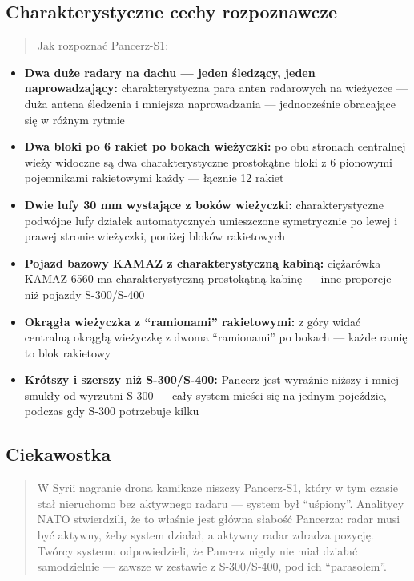 \documentclass[12pt,oneside]{book}
\providecommand{\tightlist}{%
  \setlength{\itemsep}{0pt}\setlength{\parskip}{0pt}}
\begin{document}
\subsection{Charakterystyczne cechy
rozpoznawcze}\label{charakterystyczne-cechy-rozpoznawcze-45}

\begin{quote}
Jak rozpoznać Pancerz-S1:
\end{quote}

\begin{itemize}
\tightlist
\item
  \textbf{Dwa duże radary na dachu --- jeden śledzący, jeden
  naprowadzający:} charakterystyczna para anten radarowych na wieżyczce
  --- duża antena śledzenia i mniejsza naprowadzania --- jednocześnie
  obracające się w różnym rytmie
\item
  \textbf{Dwa bloki po 6 rakiet po bokach wieżyczki:} po obu stronach
  centralnej wieży widoczne są dwa charakterystyczne prostokątne bloki z
  6 pionowymi pojemnikami rakietowymi każdy --- łącznie 12 rakiet
\item
  \textbf{Dwie lufy 30 mm wystające z boków wieżyczki:}
  charakterystyczne podwójne lufy działek automatycznych umieszczone
  symetrycznie po lewej i prawej stronie wieżyczki, poniżej bloków
  rakietowych
\item
  \textbf{Pojazd bazowy KAMAZ z charakterystyczną kabiną:} ciężarówka
  KAMAZ-6560 ma charakterystyczną prostokątną kabinę --- inne proporcje
  niż pojazdy S-300/S-400
\item
  \textbf{Okrągła wieżyczka z ``ramionami'' rakietowymi:} z góry widać
  centralną okrągłą wieżyczkę z dwoma ``ramionami'' po bokach --- każde
  ramię to blok rakietowy
\item
  \textbf{Krótszy i szerszy niż S-300/S-400:} Pancerz jest wyraźnie
  niższy i mniej smukły od wyrzutni S-300 --- cały system mieści się na
  jednym pojeździe, podczas gdy S-300 potrzebuje kilku
\end{itemize}

\subsection{Ciekawostka}\label{ciekawostka-45}

\begin{quote}
W Syrii nagranie drona kamikaze niszczy Pancerz-S1, który w tym czasie
stał nieruchomo bez aktywnego radaru --- system był ``uśpiony''.
Analitycy NATO stwierdzili, że to właśnie jest główna słabość Pancerza:
radar musi być aktywny, żeby system działał, a aktywny radar zdradza
pozycję. Twórcy systemu odpowiedzieli, że Pancerz nigdy nie miał działać
samodzielnie --- zawsze w zestawie z S-300/S-400, pod ich ``parasolem''.
\end{quote}
\end{document}
